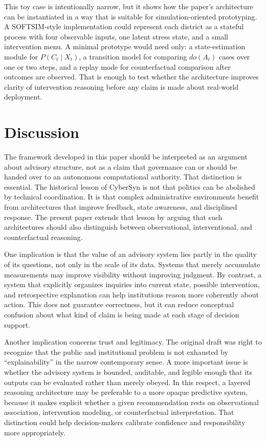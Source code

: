 \documentclass[11pt]{article}
\begin{document}
This toy case is intentionally narrow, but it shows how the paper's architecture can be instantiated in a way that is suitable for simulation-oriented prototyping. A SOFTSIM-style implementation could represent each district as a stateful process with four observable inputs, one latent stress state, and a small intervention menu. A minimal prototype would need only: a state-estimation module for $P(C_t \mid X_t)$, a transition model for comparing $do(A_t)$ cases over one or two steps, and a replay mode for counterfactual comparison after outcomes are observed. That is enough to test whether the architecture improves clarity of intervention reasoning before any claim is made about real-world deployment.

\section{Discussion}

The framework developed in this paper should be interpreted as an argument about advisory structure, not as a claim that governance can or should be handed over to an autonomous computational authority. That distinction is essential. The historical lesson of CyberSyn is not that politics can be abolished by technical coordination. It is that complex administrative environments benefit from architectures that improve feedback, state awareness, and disciplined response. The present paper extends that lesson by arguing that such architectures should also distinguish between observational, interventional, and counterfactual reasoning.

One implication is that the value of an advisory system lies partly in the quality of its questions, not only in the scale of its data. Systems that merely accumulate measurements may improve visibility without improving judgment. By contrast, a system that explicitly organizes inquiries into current state, possible intervention, and retrospective explanation can help institutions reason more coherently about action. This does not guarantee correctness, but it can reduce conceptual confusion about what kind of claim is being made at each stage of decision support.

Another implication concerns trust and legitimacy. The original draft was right to recognize that the public and institutional problem is not exhausted by ``explainability'' in the narrow contemporary sense. A more important issue is whether the advisory system is bounded, auditable, and legible enough that its outputs can be evaluated rather than merely obeyed. In this respect, a layered reasoning architecture may be preferable to a more opaque predictive system, because it makes explicit whether a given recommendation rests on observational association, intervention modeling, or counterfactual interpretation. That distinction could help decision-makers calibrate confidence and responsibility more appropriately.
\end{document}
